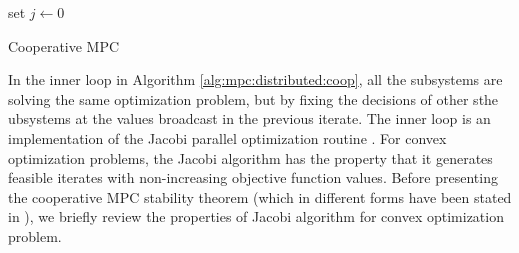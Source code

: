 \begin{algorithm}
 set $j \leftarrow 0$ \\
\caption{Cooperative MPC}
\label{alg:mpc:distributed:coop}
\end{algorithm}

In the inner loop in  Algorithm \ref{alg:mpc:distributed:coop}, all the
subsystems are solving the same optimization problem, but by fixing
the decisions of other sthe ubsystems at the values broadcast in the 
previous iterate. The inner loop is an implementation of the
Jacobi parallel optimization routine \citep[Section
3.3.5]{bertsekas:tsitsiklis:1989}. For convex optimization problems,
the Jacobi algorithm has the property that it generates feasible
iterates with non-increasing objective function values. Before
presenting the cooperative MPC stability theorem
(which in different forms have been stated in
\citet{stewart:venkat:rawlings:wright:pannocchia:2010, venkat:2006, stewart:wright:rawlings:2011, subramanian:rawlings:maravelias:2012}), we
briefly review the properties of Jacobi algorithm for convex
optimization problem.

